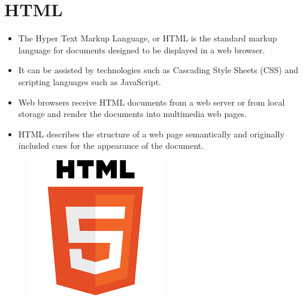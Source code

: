 \documentclass{article}
\begin{document}
		\section*{HTML}
	\begin{itemize}
		\item The Hyper Text Markup Language, or HTML is the standard markup language for documents designed to be displayed in a web browser.
		\item It can be assisted by technologies such as Cascading Style Sheets (CSS) and scripting languages such as JavaScript.
		\item Web browsers receive HTML documents from a web server or from local storage and render the documents into multimedia web pages.
		\item HTML describes the structure of a web page semantically and originally included cues for the appearance of the document.
	\end{itemize}
\begin{figure}
		\begin{center}
	\includegraphics[width=0.3\linewidth]{html.png}
\end{center}
\end{figure}
	\newpage
	\pagecolor{black}
	\color{white}
\end{document}
